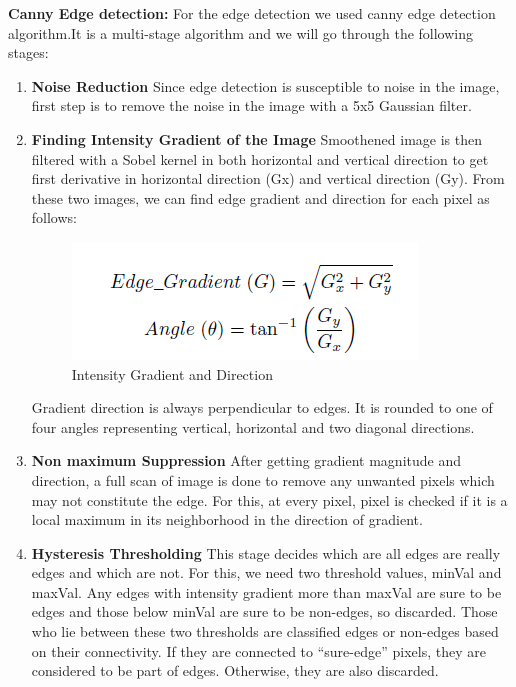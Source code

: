 \documentclass[12pt, a4paper]{article}
\begin{document}
\textbf{Canny Edge detection:}
For the edge detection we used canny edge detection algorithm.It is a multi-stage algorithm and we will go through the following stages:
\begin{enumerate}
\item \textbf {Noise Reduction}
Since edge detection is susceptible to noise in the image, first step is to remove the noise in the image with a 5x5 Gaussian filter.

\item \textbf{Finding Intensity Gradient of the Image}
Smoothened image is then filtered with a Sobel kernel in both horizontal and vertical direction to get first derivative in horizontal direction (Gx) and vertical direction (Gy). From these two images, we can find edge gradient and direction for each pixel as follows:
\begin{figure}[htp]
\centering
\includegraphics[scale=0.7]{canny.png}
\caption{Intensity Gradient and Direction}
\label{}
\end{figure}
Gradient direction is always perpendicular to edges. It is rounded to one of four angles   representing vertical, horizontal and two diagonal directions.
\item \textbf{Non maximum Suppression}
After getting gradient magnitude and direction, a full scan of image is done to remove any unwanted pixels which may not constitute the edge. For this, at every pixel, pixel is checked ­if it is a local maximum in its neighborhood in the direction of gradient.

\item \textbf{Hysteresis Thresholding}
This stage decides which are all edges are really edges and which are not. For this, we need two threshold values, minVal and maxVal. Any edges with intensity gradient more than maxVal are sure to be edges and those below minVal are sure to be non-edges, so discarded. Those who lie between these two thresholds are classified edges or non-edges based on their connectivity. If they are connected to “sure-edge” pixels, they are considered to be part of edges. Otherwise, they are also discarded.
\end{enumerate}
\end{document}
